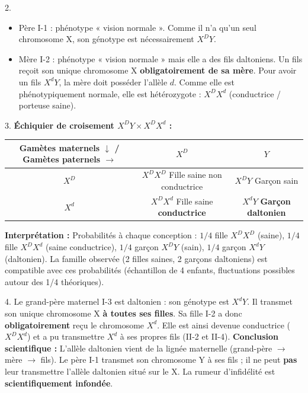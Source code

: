 \documentclass[11pt]{article}
\begin{document}
\begin{exoresolu}
2. \begin{itemize}
    \item Père I-1 : phénotype « vision normale ». Comme il n'a qu'un seul chromosome X, son génotype est nécessairement \textbf{$X^D Y$}.
    \item Mère I-2 : phénotype « vision normale » mais elle a des fils daltoniens. Un fils reçoit son unique chromosome X \textbf{obligatoirement de sa mère}. Pour avoir un fils $X^d Y$, la mère doit posséder l'allèle $d$. Comme elle est phénotypiquement normale, elle est hétérozygote : \textbf{$X^D X^d$} (conductrice / porteuse saine).
\end{itemize}

3. \textbf{Échiquier de croisement $X^D Y \times X^D X^d$ :}

\begin{center}
\begin{tabular}{|c|c|c|}
\hline
\rowcolor{popblueL} \textbf{Gamètes maternels $\downarrow$ / Gamètes paternels $\rightarrow$} & \textbf{$X^D$} & \textbf{$Y$} \\
\hline
\textbf{$X^D$} & $X^D X^D$ \newline Fille saine non conductrice & $X^D Y$ \newline Garçon sain \\
\hline
\textbf{$X^d$} & $X^D X^d$ \newline Fille saine \textbf{conductrice} & $X^d Y$ \newline \textbf{Garçon daltonien} \\
\hline
\end{tabular}
\end{center}

\textbf{Interprétation :} Probabilités à chaque conception : $1/4$ fille $X^D X^D$ (saine), $1/4$ fille $X^D X^d$ (saine conductrice), $1/4$ garçon $X^D Y$ (sain), $1/4$ garçon $X^d Y$ (daltonien).
La famille observée (2 filles saines, 2 garçons daltoniens) est compatible avec ces probabilités (échantillon de 4 enfants, fluctuations possibles autour des 1/4 théoriques).

4. Le grand-père maternel I-3 est daltonien : son génotype est \textbf{$X^d Y$}. Il transmet son unique chromosome X \textbf{à toutes ses filles}. Sa fille I-2 a donc \textbf{obligatoirement} reçu le chromosome $X^d$. Elle est ainsi devenue conductrice ($X^D X^d$) et a pu transmettre $X^d$ à ses propres fils (II-2 et II-4).
\textbf{Conclusion scientifique :} L'allèle daltonien vient de la lignée maternelle (grand-père $\rightarrow$ mère $\rightarrow$ fils). Le père I-1 transmet son chromosome Y à ses fils ; il ne peut \textbf{pas} leur transmettre l'allèle daltonien situé sur le X. La rumeur d'infidélité est \textbf{scientifiquement infondée}.


\end{exoresolu}
\end{document}
